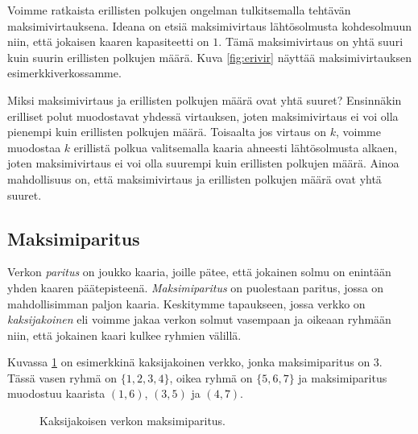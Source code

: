 Voimme ratkaista erillisten polkujen ongelman
tulkitsemalla tehtävän maksimivirtauksena.
Ideana on etsiä maksimivirtaus lähtösolmusta kohdesolmuun
niin, että jokaisen kaaren kapasiteetti on $1$.
Tämä maksimivirtaus on yhtä suuri kuin suurin
erillisten polkujen määrä.
Kuva \ref{fig:erivir} näyttää maksimivirtauksen
esimerkkiverkossamme.

Miksi maksimivirtaus ja erillisten polkujen määrä ovat yhtä suuret?
Ensinnäkin erilliset polut muodostavat yhdessä virtauksen,
joten maksimivirtaus ei voi olla pienempi kuin erillisten polkujen määrä.
Toisaalta jos virtaus on $k$, voimme muodostaa $k$ erillistä polkua
valitsemalla kaaria ahneesti lähtösolmusta alkaen,
joten maksimivirtaus ei voi olla suurempi kuin erillisten polkujen määrä.
Ainoa mahdollisuus on, että maksimivirtaus ja erillisten polkujen määrä
ovat yhtä suuret.

\subsection{Maksimiparitus}

Verkon \emph{paritus} on joukko kaaria, joille pätee,
että jokainen solmu on enintään yhden kaaren päätepisteenä.
\emph{Maksimiparitus} on puolestaan paritus,
jossa on mahdollisimman paljon kaaria.
Keskitymme tapaukseen,
jossa verkko on \emph{kaksijakoinen} eli
voimme jakaa verkon solmut
vasempaan ja oikeaan ryhmään niin, että jokainen
kaari kulkee ryhmien välillä.

Kuvassa \ref{fig:makpar} on esimerkkinä kaksijakoinen verkko,
jonka maksimiparitus on $3$.
Tässä vasen ryhmä on $\{1,2,3,4\}$, oikea ryhmä on $\{5,6,7\}$
ja maksimiparitus muodostuu kaarista
$(1,6)$, $(3,5)$ ja $(4,7)$.

\begin{figure}
\center
\begin{center}
\end{center}
\caption{Kaksijakoisen verkon maksimiparitus.}
\label{fig:makpar}
\end{figure}

